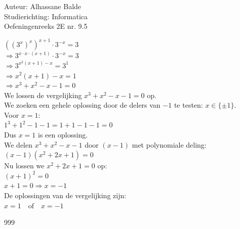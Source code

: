 \documentclass[a4paper]{article}
\begin{document}
\noindent \large Auteur: Alhassane Balde\\
\noindent \large Studierichting: Informatica\\
\noindent \large Oefeningenreeks 2E nr. 9.5\\

\medskip

\normalsize


$ \left( (3^x)^x \right)^{x+1} \cdot 3^{-x} = 3 $ \\  

$ \Rightarrow 3^{x \cdot x \cdot (x+1)} \cdot 3^{-x} = 3 $ \\  

$ \Rightarrow 3^{x^2(x+1) - x} = 3^1 $ \\ 

$ \Rightarrow x^2(x+1) - x = 1 $ \\  

$ \Rightarrow x^3 + x^2 - x - 1 = 0 $ \\

We lossen de vergelijking $ x^3 + x^2 - x - 1 = 0 $ op. \\  

We zoeken een gehele oplossing door de delers van $ -1 $ te testen: $ x \in \{\pm 1\} $. \\  

Voor $ x = 1 $: \\  

$ 1^3 + 1^2 - 1 - 1 = 1 + 1 - 1 - 1 = 0 $ \\  

Dus $ x = 1 $ is een oplossing. \\  

We delen $ x^3 + x^2 - x - 1 $ door $ (x - 1) $ met polynomiale deling: \\  

$ (x - 1)(x^2 + 2x + 1) = 0 $ \\  

Nu lossen we $ x^2 + 2x + 1 = 0 $ op: \\  

$ (x + 1)^2 = 0 $ \\  

$ x + 1 = 0 \Rightarrow x = -1 $ \\  

De oplossingen van de vergelijking zijn: \\  

$ x = 1 \quad \text{of} \quad x = -1 $  


\begin{thebibliography}{999}
\end{thebibliography}
\end{document}
